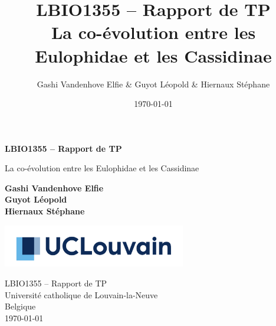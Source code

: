 \documentclass[a4paper, 12pt]{article}
\title{\Large LBIO1355 – Rapport de TP \\
\huge La co-évolution entre les Eulophidae et les Cassidinae}
\author{Gashi Vandenhove Elfie & Guyot Léopold & Hiernaux Stéphane}
\date{\today}
\begin{document}
\begin{titlepage}
   \begin{center}
       \vspace*{1cm}

        \LARGE
       \textbf{ LBIO1355 – Rapport de TP}

       \vspace{0.5cm}
       \Large
       La co-évolution entre les Eulophidae et les Cassidinae
            
       \vspace{1.5cm}
        \Large
       \textbf{Gashi Vandenhove Elfie\\ Guyot Léopold\\ Hiernaux Stéphane}

       \vfill
       \vspace{0.8cm}
     
       \includegraphics[width=0.6\textwidth]{UCLouvain_Logo_Pos_CMJN.pdf}
            
      \large LBIO1355 – Rapport de TP\\
       Université catholique de Louvain-la-Neuve\\
       Belgique\\
       \today
            
   \end{center}
\end{titlepage}


\pagestyle{fancy}
\fancyhead{}\fancyfoot{}
\end{document}
